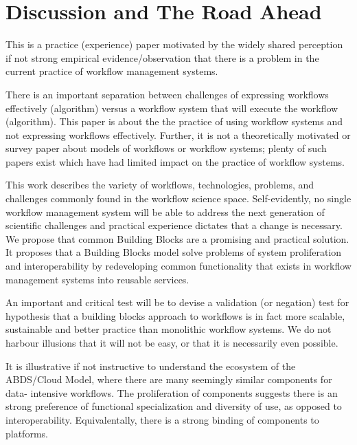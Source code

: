 \section{Discussion and The Road Ahead}

This is a practice (experience) paper motivated by the widely shared
perception if not strong empirical evidence/observation  that  there is a
problem in the current practice of workflow management systems.

There is an important separation between challenges of expressing workflows
effectively (algorithm) versus a workflow system that will execute the
workflow (algorithm). This paper is about the  the practice of using workflow
systems and not expressing workflows effectively. Further, it is not a
theoretically motivated or survey paper about models of workflows or workflow
systems; plenty of such papers exist which have had limited impact on the
practice of workflow systems. 

This work describes the variety of workflows, technologies, problems, and
challenges commonly found in the workflow science space.  Self-evidently, no
single workflow management system will be able to address the next generation
of scientific challenges and practical experience dictates that a change is
necessary. We propose  that common Building Blocks are a promising and
practical solution. It proposes that a Building Blocks model solve problems of
system proliferation and interoperability by redeveloping common functionality
that exists in workflow management systems into reusable services.

An important and critical test will be to devise a validation (or negation)
test for hypothesis that a building blocks approach to workflows is in fact
more scalable, sustainable and better practice than monolithic workflow
systems. We do not harbour illusions that it will not be easy, or that it is
necessarily even possible.

It is illustrative if not instructive to understand the ecosystem of the
ABDS/Cloud Model, where there are many seemingly similar components for  data-
intensive workflows. The proliferation of components suggests there is an
strong preference of functional specialization and diversity of use, as
opposed to interoperability.  Equivalentally, there is a strong binding of
components to platforms.

